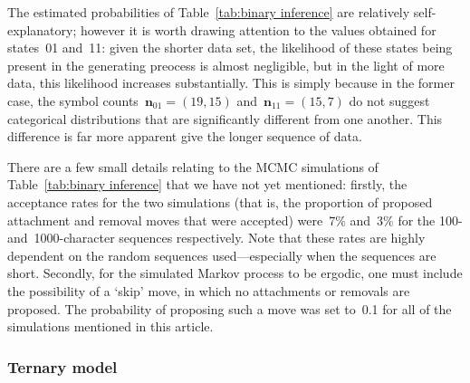 \documentclass[12pt,a4paper]{article}
\newcommand\ub[1]{\symbf{#1}}                 %
\begin{document}
The estimated probabilities of Table~\ref{tab:binary inference} are relatively
self-explanatory; however it is worth drawing attention to the values obtained
for states~01 and~11: given the shorter data set, the likelihood of these states
being present in the generating preocess is almost negligible, but in the light
of more data, this likelihood increases substantially. This is simply because in
the former case, the symbol counts~\(\ub{n}_{01} = (19, 15)\) and~\(\ub{n}_{11}
= (15, 7)\) do not suggest categorical distributions that are significantly
different from one another. This difference is far more apparent give the longer
sequence of data.

There are a few small details relating to the MCMC simulations of
Table~\ref{tab:binary inference} that we have not yet mentioned: firstly, the
acceptance rates for the two simulations (that is, the proportion of proposed
attachment and removal moves that were accepted) were~7\% and~3\% for the 100-
and~1000-character sequences respectively. Note that these rates are highly
dependent on the random sequences used---especially when the sequences are
short. Secondly, for the simulated Markov process to be ergodic, one must
include the possibility of a `skip' move, in which no attachments or removals
are proposed. The probability of proposing such a move was set to~0.1 for all of
the simulations mentioned in this article.

\subsubsection{Ternary model} %
\end{document}
